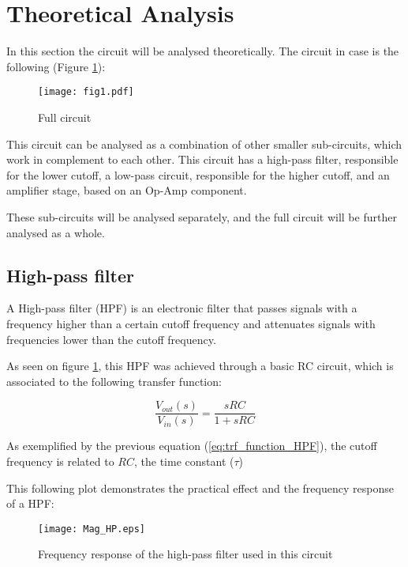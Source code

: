 \section{Theoretical Analysis}
\label{sec:analysis}
\indent

In this section the circuit will be analysed theoretically. The circuit in case is the following (Figure \ref{fig:Circuit}):

\begin{figure}[H]
    \centering
    \texttt{[image: fig1.pdf]}
    \caption{Full circuit}
    \label{fig:Circuit}
\end{figure}

This circuit can be analysed as a combination of other smaller sub-circuits, which work in complement to each other. This circuit has a high-pass filter, responsible for the lower cutoff, a low-pass circuit, responsible for the higher cutoff, and an amplifier stage, based on an Op-Amp component.

These sub-circuits will be analysed separately, and the full circuit will be further analysed as a whole. 

\subsection{High-pass filter}

\indent

A High-pass filter (HPF) is an electronic filter that passes signals with a frequency higher than a certain cutoff frequency and attenuates signals with frequencies lower than the cutoff frequency.

As seen on figure \ref{fig:Circuit}, this HPF was achieved through a basic RC circuit, which is associated to the following transfer function:

\begin{equation}
    \frac{V_{out}(s)}{V_{in}(s)} = \frac{sRC}{1+sRC}
    \label{eq:trf_function_HPF}
\end{equation}

As exemplified by the previous equation (\ref{eq:trf_function_HPF}), the cutoff frequency is related to $RC$, the time constant ($\tau$)

This following plot demonstrates the practical effect and the frequency response of a HPF:

\begin{figure}[H]
    \centering
    \texttt{[image: Mag\_HP.eps]}
    \caption{Frequency response of the high-pass filter used in this circuit}
    \label{fig:freq_response_HPF}
\end{figure}

